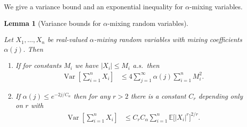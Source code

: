 \documentclass[11pt,lof]{puthesis}
\newcommand{\E}{\ensuremath{\mathbb{E}}}
\DeclareMathOperator{\Var}{Var}
\theoremstyle{break}
\newtheorem{lemma}{Lemma}[section]
\theoremstyle{proof}
\begin{document}
We give a variance bound and an exponential inequality for $\alpha$-mixing
variables.

\begin{lemma}[Variance bounds for
\texorpdfstring{$\alpha$}{alpha}-mixing random variables]
\label{lem:yurinskii_app_variance_mixing}

Let $X_1, \ldots, X_n$ be
real-valued $\alpha$-mixing random
variables with mixing coefficients $\alpha(j)$.
Then
%
\begin{enumerate}[label=(\roman*)]

\item
\label{it:yurinskii_app_variance_mixing_bounded}
If for constants $M_i$ we have
$|X_i| \leq M_i$ a.s.\ then
%
\begin{align*}
\Var\left[
\sum_{i=1}^n X_i
\right]
&\leq
4 \sum_{j=1}^\infty \alpha(j)
\sum_{i=1}^n M_i^2.
\end{align*}

\item
\label{it:yurinskii_app_variance_mixing_exponential}
If $\alpha(j) \leq e^{-2j / C_\alpha}$ then
for any $r>2$ there is a constant
$C_r$ depending only on $r$ with
%
\begin{align*}
\Var\left[
\sum_{i=1}^n X_i
\right]
&\leq
C_r C_\alpha
\sum_{i=1}^n
\E\big[|X_i|^r\big]^{2/r}.
\end{align*}
\end{enumerate}
%
\end{lemma}
\end{document}
